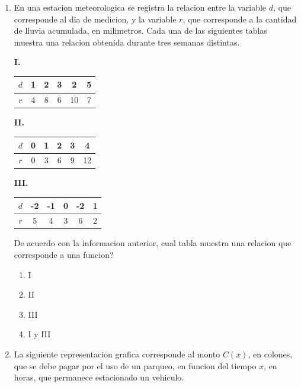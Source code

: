 \documentclass[12pt]{article}
\newcommand{\tablarel}[2]{%
\begin{tabular}{|c|*{5}{c|}}
\hline
#1 \\ \hline
#2 \\ \hline
\end{tabular}}
\begin{document}
\begin{enumerate}[label=\textbf{\arabic*.}, itemsep=1.05cm]

\Needspace{0.82\textheight}
\item
En una estacion meteorologica se registra la relacion entre la variable $d$, que corresponde al dia de medicion, y la variable $r$, que corresponde a la cantidad de lluvia acumulada, en milimetros. Cada una de las siguientes tablas muestra una relacion obtenida durante tres semanas distintas.

\textbf{I.}

\begin{center}
\tablarel{$d$ & 1 & 2 & 3 & 2 & 5}{$r$ & 4 & 8 & 6 & 10 & 7}
\end{center}

\textbf{II.}

\begin{center}
\tablarel{$d$ & 0 & 1 & 2 & 3 & 4}{$r$ & 0 & 3 & 6 & 9 & 12}
\end{center}

\textbf{III.}

\begin{center}
\tablarel{$d$ & -2 & -1 & 0 & -2 & 1}{$r$ & 5 & 4 & 3 & 6 & 2}
\end{center}

De acuerdo con la informacion anterior, \textquestiondown cual tabla muestra una relacion que corresponde a una funcion?

\begin{enumerate}[label=\Alph*)]
  \item I
  \item II
  \item III
  \item I y III
\end{enumerate}

\Needspace{0.88\textheight}
\item
La siguiente representacion grafica corresponde al monto $C(x)$, en colones, que se debe pagar por el uso de un parqueo, en funcion del tiempo $x$, en horas, que permanece estacionado un vehiculo.

\begin{center}
\end{center}
\end{enumerate}
\end{document}
